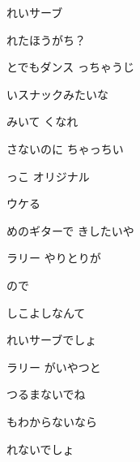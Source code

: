 \documentclass[a4paper,tate,twocolumn,12pt]{ltjtarticle}
\begin{document}
\thispagestyle{empty}

\begin{center}
{\LARGE {}れいサーブ}
\end{center}

\vspace{1em}

\begin{flushleft}

\noindent\begin{minipage}{\linewidth}
れたほうがち？

とでもダンス っちゃうじ

いスナックみたいな

みいて くなれ
\end{minipage}

\vspace{2em}

\noindent\begin{minipage}{\linewidth}
さないのに ちゃっちい

っこ オリジナル

ウケる 

めのギターで きしたいや
\end{minipage}

\vspace{2em}

\noindent\begin{minipage}{\linewidth}
ラリー やりとりが

ので

しこよしなんて

れいサーブでしょ

ラリー がいやつと

つるまないでね

もわからないなら

れないでしょ
\end{minipage}

\vspace{2em}


\end{flushleft}
\end{document}
